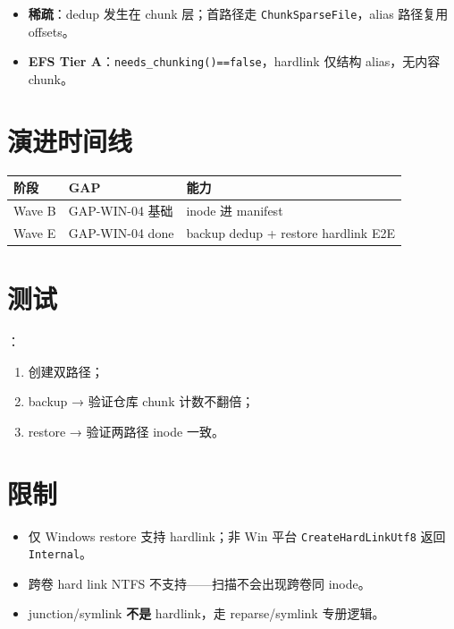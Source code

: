 \begin{itemize}[nosep]
  \item \textbf{稀疏}：dedup 发生在 chunk 层；首路径走 \texttt{ChunkSparseFile}，alias 路径复用 offsets。
  \item \textbf{EFS Tier A}：\texttt{needs\_chunking()==false}，hardlink 仅结构 alias，无内容 chunk。
\end{itemize}

\section{演进时间线}

\begin{longtable}{@{}llp{8cm}@{}}
\toprule
阶段 & GAP & 能力 \\
\midrule
Wave B & GAP-WIN-04 基础 & inode 进 manifest \\
Wave E & GAP-WIN-04 done & backup dedup + restore hardlink E2E \\
\bottomrule
\end{longtable}

\section{测试}

：

\begin{enumerate}[nosep]
  \item {} 创建双路径；
  \item backup → 验证仓库 chunk 计数不翻倍；
  \item restore →  验证两路径 inode 一致。
\end{enumerate}

\section{限制}

\begin{itemize}[nosep]
  \item 仅 Windows restore 支持 hardlink；非 Win 平台 \texttt{CreateHardLinkUtf8} 返回 \texttt{Internal}。
  \item 跨卷 hard link NTFS 不支持——扫描不会出现跨卷同 inode。
  \item junction/symlink \textbf{不是} hardlink，走 reparse/symlink 专册逻辑。
\end{itemize}
